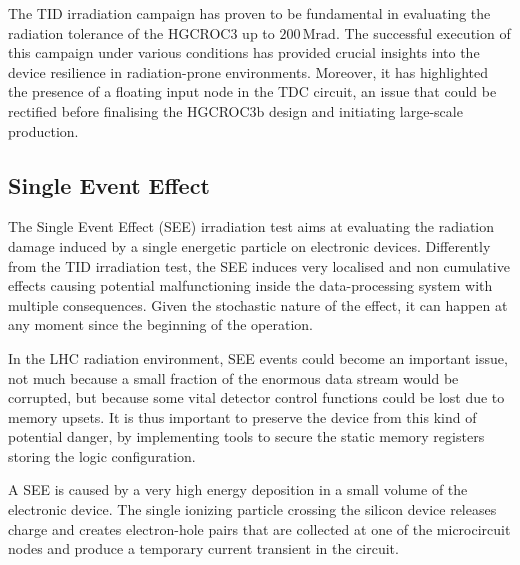 \bigbreak

The TID irradiation campaign has proven to be fundamental in evaluating the radiation tolerance of the HGCROC3 up to $200\,\textrm{Mrad}$. The successful execution of this campaign under various conditions has provided crucial insights into the device resilience in radiation-prone environments. 
Moreover, it has highlighted the presence of a floating input node in the TDC circuit, an issue that could be rectified before finalising the HGCROC3b design and initiating large-scale production. 


\subsection{Single Event Effect}
\label{subsec:Single Event Effect}

The Single Event Effect (SEE) irradiation test aims at evaluating the radiation damage induced by a single energetic particle on electronic devices. Differently from the TID irradiation test, the SEE induces very localised and non cumulative effects causing potential malfunctioning inside the data-processing system with multiple consequences. Given the stochastic nature of the effect, it can happen at any moment since the beginning of the operation.

In the LHC radiation environment, SEE events could become an important issue, not much because a small fraction of the enormous data stream would be corrupted, but because some vital detector control functions could be lost due to memory upsets. It is thus important to preserve the device from this kind of potential danger, by implementing tools to secure the static memory registers storing the logic configuration.

\bigbreak

A SEE is caused by a very high energy deposition in a small volume of the electronic device. The single ionizing particle crossing the silicon device releases charge and creates electron-hole pairs that are collected at one of the microcircuit nodes and produce a temporary current transient in the circuit. 

